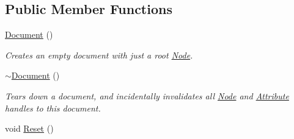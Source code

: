 \subsection*{Public Member Functions}
\begin{DoxyCompactItemize}
\item 
\hypertarget{classphys_1_1xml_1_1Document_ae1e779f0826bf3357ff77846155aad7d}{
\hyperlink{classphys_1_1xml_1_1Document_ae1e779f0826bf3357ff77846155aad7d}{Document} ()}
\label{dd/d44/classphys_1_1xml_1_1Document_ae1e779f0826bf3357ff77846155aad7d}

\begin{DoxyCompactList}\small\item\em Creates an empty document with just a root \hyperlink{classphys_1_1xml_1_1Node}{Node}. \item\end{DoxyCompactList}\item 
\hypertarget{classphys_1_1xml_1_1Document_a70013c2b670c4d4b5ee55d12e7c50be4}{
\hyperlink{classphys_1_1xml_1_1Document_a70013c2b670c4d4b5ee55d12e7c50be4}{$\sim$Document} ()}
\label{dd/d44/classphys_1_1xml_1_1Document_a70013c2b670c4d4b5ee55d12e7c50be4}

\begin{DoxyCompactList}\small\item\em Tears down a document, and incidentally invalidates all \hyperlink{classphys_1_1xml_1_1Node}{Node} and \hyperlink{classphys_1_1xml_1_1Attribute}{Attribute} handles to this document. \item\end{DoxyCompactList}\item 
\hypertarget{classphys_1_1xml_1_1Document_a9ab556271e4a1214ecb35ba6aef9e8e4}{
void \hyperlink{classphys_1_1xml_1_1Document_a9ab556271e4a1214ecb35ba6aef9e8e4}{Reset} ()}
\label{dd/d44/classphys_1_1xml_1_1Document_a9ab556271e4a1214ecb35ba6aef9e8e4}


\end{DoxyCompactItemize}
